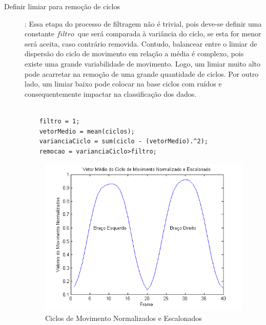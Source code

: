 \begin{description}
		
	\item [Definir limiar para remoção de ciclos]: Essa etapa do processo de filtragem não é trivial, pois deve-se definir uma constante $ filtro $\ que será comparada à variância do ciclo, se esta for menor será aceita, caso contrário removida. Contudo,	balancear entre o limiar de dispersão do ciclo de movimento em relação a média é complexo, pois existe uma grande variabilidade de movimento. Logo, um limiar muito alto pode acarretar na remoção de uma grande quantidade de ciclos. Por outro lado, um limiar baixo pode colocar na base ciclos com ruídos e consequentemente impactar na classificação dos dados.	
	\lstset{language=Matlab}
	\begin{lstlisting}[frame=single, caption=Filtro dos Ciclos]  % Start your code-block
		
    filtro = 1;
    vetorMedio = mean(ciclos);
    varianciaCiclo = sum(ciclo - (vetorMedio).^2);
    remocao = varianciaCiclo>filtro;
	\end{lstlisting}
	
	\begin{figure}
     \centering
     \includegraphics[width=1\textwidth]{./img/vetormedionormalozadoescalonado.png}
     \caption{Ciclos de Movimento Normalizados e Escalonados}
		 \label{img:ciclos_normalizado_escalonado}
	\end{figure}
\end{description}



